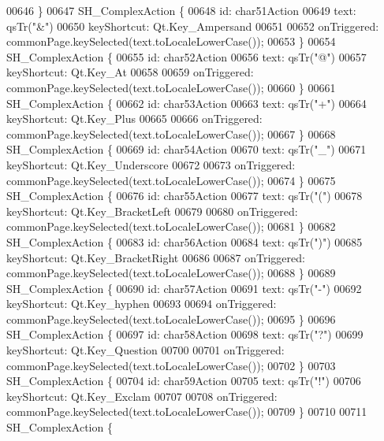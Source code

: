 \begin{DoxyCode}
00646     \}
00647     SH\_ComplexAction \{
00648         \textcolor{keywordtype}{id}: char51Action
00649         text: qsTr(\textcolor{stringliteral}{"&"})
00650         keyShortcut: Qt.Key\_Ampersand
00651 
00652         onTriggered: commonPage.keySelected(text.toLocaleLowerCase());
00653     \}
00654     SH\_ComplexAction \{
00655         \textcolor{keywordtype}{id}: char52Action
00656         text: qsTr(\textcolor{stringliteral}{"@"})
00657         keyShortcut: Qt.Key\_At
00658 
00659         onTriggered: commonPage.keySelected(text.toLocaleLowerCase());
00660     \}
00661     SH\_ComplexAction \{
00662         \textcolor{keywordtype}{id}: char53Action
00663         text: qsTr(\textcolor{stringliteral}{"+"})
00664         keyShortcut: Qt.Key\_Plus
00665 
00666         onTriggered: commonPage.keySelected(text.toLocaleLowerCase());
00667     \}
00668     SH\_ComplexAction \{
00669         \textcolor{keywordtype}{id}: char54Action
00670         text: qsTr(\textcolor{stringliteral}{"\_"})
00671         keyShortcut: Qt.Key\_Underscore
00672 
00673         onTriggered: commonPage.keySelected(text.toLocaleLowerCase());
00674     \}
00675     SH\_ComplexAction \{
00676         \textcolor{keywordtype}{id}: char55Action
00677         text: qsTr(\textcolor{stringliteral}{"("})
00678         keyShortcut: Qt.Key\_BracketLeft
00679 
00680         onTriggered: commonPage.keySelected(text.toLocaleLowerCase());
00681     \}
00682     SH\_ComplexAction \{
00683         \textcolor{keywordtype}{id}: char56Action
00684         text: qsTr(\textcolor{stringliteral}{")"})
00685         keyShortcut: Qt.Key\_BracketRight
00686 
00687         onTriggered: commonPage.keySelected(text.toLocaleLowerCase());
00688     \}
00689     SH\_ComplexAction \{
00690         \textcolor{keywordtype}{id}: char57Action
00691         text: qsTr(\textcolor{stringliteral}{"-"})
00692         keyShortcut: Qt.Key\_hyphen
00693 
00694         onTriggered: commonPage.keySelected(text.toLocaleLowerCase());
00695     \}
00696     SH\_ComplexAction \{
00697         \textcolor{keywordtype}{id}: char58Action
00698         text: qsTr(\textcolor{stringliteral}{"?"})
00699         keyShortcut: Qt.Key\_Question
00700 
00701         onTriggered: commonPage.keySelected(text.toLocaleLowerCase());
00702     \}
00703     SH\_ComplexAction \{
00704         \textcolor{keywordtype}{id}: char59Action
00705         text: qsTr(\textcolor{stringliteral}{"!"})
00706         keyShortcut: Qt.Key\_Exclam
00707 
00708         onTriggered: commonPage.keySelected(text.toLocaleLowerCase());
00709     \}
00710 
00711     SH\_ComplexAction \{

\end{DoxyCode}
